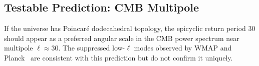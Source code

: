 \subsection{Testable Prediction: CMB Multipole}

If the universe has Poincar\'{e} dodecahedral topology, the epicyclic return period $30$ should appear as a preferred angular scale in the CMB power spectrum near multipole $\ell \approx 30$. The suppressed low-$\ell$ modes observed by WMAP and Planck~\cite{planck2020} are consistent with this prediction but do not confirm it uniquely.

